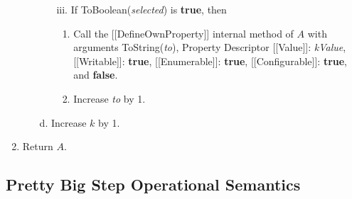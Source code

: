 \documentclass[a4paper,11pt,twoside]{report}
\begin{document}
\begin{enumerate}
\begin{enumerate}
\begin{enumerate}
\item[iii.] If ToBoolean(\textit{selected}) is \textbf{true}, then
\begin{enumerate}
\item Call the [[DefineOwnProperty]] internal method of $A$ with arguments ToString(\textit{to}), Property Descriptor {[[Value]]: \textit{kValue}, [[Writable]]: \textbf{true}, [[Enumerable]]: \textbf{true}, [[Configurable]]: \textbf{true}}, and \textbf{false}.
\item Increase \textit{to} by 1.
\end{enumerate}
\end{enumerate}
\item[d.] Increase $k$ by 1.
\end{enumerate}
\item Return $A$.
\end{enumerate}

\subsection{Pretty Big Step Operational Semantics}
\end{document}

